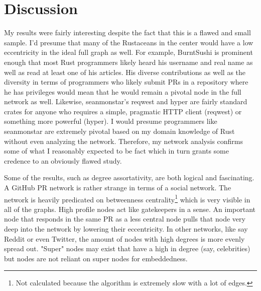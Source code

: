 \documentclass[12pt, a4paper]{article}
\begin{document}
\section{Discussion}
My results were fairly interesting despite the fact that this is a flawed and small sample. I'd presume that many of the Rustaceans in the center would have a low eccentricity in the ideal full graph as well. For example, BurntSushi is prominent enough that most Rust programmers likely heard his username and real name as well as read at least one of his articles. His diverse contributions as well as the diversity in terms of programmers who likely submit PRs in a repository where he has privileges would mean that he would remain a pivotal node in the full network as well. Likewise, seanmonstar's reqwest and hyper are fairly standard crates for anyone who requires a simple, pragmatic HTTP client (reqwest) or something more powerful (hyper). I would presume programmers like seanmonstar are extremely pivotal based on my domain knowledge of Rust without even analyzing the network. Therefore, my network analysis confirms some of what I reasonably expected to be fact which in turn grants some credence to an obviously flawed study.

Some of the results, such as degree assortativity, are both logical and fascinating. A GitHub PR network is rather strange in terms of a social network. The network is heavily predicated on betweenness centrality\footnote{Not calculated because the algorithm is extremely slow with a lot of edges.} which is very visible in all of the graphs. High profile nodes act like gatekeepers in a sense. An important node that responds in the same PR as a less central node pulls that node very deep into the network by lowering their eccentricity. In other networks, like say Reddit or even Twitter, the amount of nodes with high degrees is more evenly spread out. "Super" nodes may exist that have a high in degree (say, celebrities) but nodes are not reliant on super nodes for embeddedness.

\printbibliography
\end{document}
